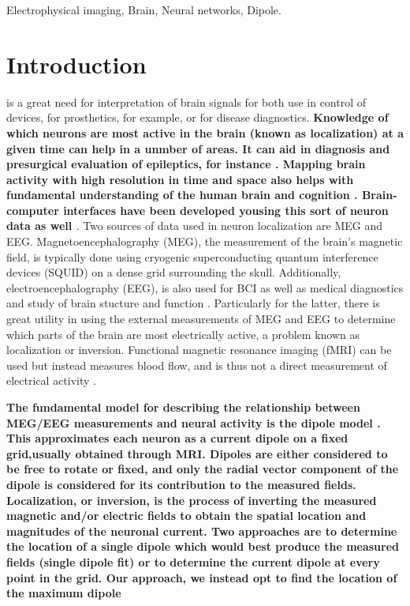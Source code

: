 \documentclass[journal]{IEEEtran}
\begin{document}
\begin{IEEEkeywords}
Electrophysical imaging, Brain, Neural networks, Dipole.
\end{IEEEkeywords}



\IEEEpeerreviewmaketitle



\section{Introduction}

 is a great need for interpretation of brain signals for both use in control of devices, for prosthetics, for example, or for disease diagnostics. \textbf{Knowledge of which neurons are most active in the brain (known as localization) at a given time can help in a unmber of areas. It can aid in diagnosis and presurgical evaluation of epileptics, for instance \cite{knake2006value}. Mapping brain activity with high resolution in time and space also helps with fundamental understanding of the human brain and cognition \cite{de2001localization}. Brain-computer interfaces have been developed yousing this sort of neuron data as well \cite{mellinger2007meg}}. Two sources of data used in neuron localization are MEG and EEG. Magnetoencephalography (MEG), the measurement of the brain's magnetic field, is typically done using cryogenic superconducting quantum interference devices (SQUID) on a dense grid surrounding the skull. Additionally, electroencephalography (EEG), is also used for BCI as well as medical diagnostics and study of brain stucture and function \cite{da2008impact}. Particularly for the latter, there is great utility in using the external measurements of MEG and EEG to determine which parts of the brain are most electrically active, a problem known as localization or inversion. Functional magnetic resonance imaging (fMRI) can be used but instead measures blood flow, and is thus not a direct measurement of electrical activity \cite{sharon2007advantage}. 

\textbf{The fundamental model for describing the relationship between MEG/EEG measurements and neural activity is the dipole model \cite{mosher1992multiple}. This approximates each neuron as a current dipole on a fixed grid,usually obtained through MRI. Dipoles are either considered to be free to rotate or fixed, and only the radial vector component of the dipole is considered for its contribution to the measured fields. Localization, or inversion, is the process of inverting the measured magnetic and/or electric fields to obtain the spatial location and magnitudes of the neuronal current. Two approaches are to determine the location of a single dipole which would best produce the measured fields (single dipole fit) or to determine the current dipole at every point in the grid. Our approach, we instead opt to find the location of the maximum dipole}
\end{document}
